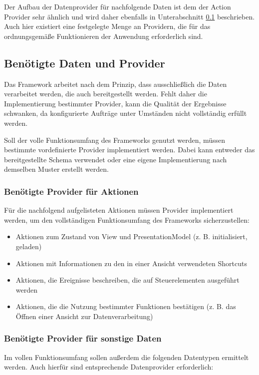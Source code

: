Der Aufbau der Datenprovider für nachfolgende Daten ist dem der Action Provider sehr ähnlich und wird daher ebenfalls in Unterabschnitt \ref{subsec:required_provider_and_data} beschrieben. Auch hier existiert eine festgelegte Menge an Providern, die für das ordnungsgemäße Funktionieren der Anwendung erforderlich sind.

\subsection{Benötigte Daten und Provider}
\label{subsec:required_provider_and_data}
Das Framework arbeitet nach dem Prinzip, dass ausschließlich die Daten verarbeitet werden, die auch bereitgestellt werden. Fehlt daher die Implementierung bestimmter Provider, kann die Qualität der Ergebnisse schwanken, da konfigurierte Aufträge unter Umständen nicht vollständig erfüllt werden.

Soll der volle Funktionsumfang des Frameworks genutzt werden, müssen bestimmte vordefinierte Provider implementiert werden. Dabei kann entweder das bereitgestellte Schema verwendet oder eine eigene Implementierung nach demselben Muster erstellt werden.

\subsubsection{Benötigte Provider für Aktionen}
Für die nachfolgend aufgelisteten Aktionen müssen Provider implementiert werden, um den vollständigen Funktionsumfang des Frameworks sicherzustellen:

\begin{itemize}
    \item Aktionen zum Zustand von View und PresentationModel (z. B. initialisiert, geladen)
    \item Aktionen mit Informationen zu den in einer Ansicht verwendeten Shortcuts
    \item Aktionen, die Ereignisse beschreiben, die auf Steuerelementen ausgeführt werden
    \item Aktionen, die die Nutzung bestimmter Funktionen bestätigen (z. B. das Öffnen einer Ansicht zur Datenverarbeitung)
\end{itemize}

\subsubsection{Benötigte Provider für sonstige Daten}
Im vollen Funktionsumfang sollen außerdem die folgenden Datentypen ermittelt werden. Auch hierfür sind entsprechende Datenprovider erforderlich:

